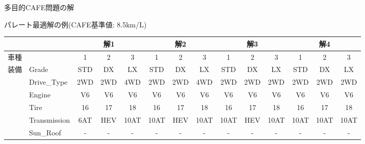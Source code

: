 \documentclass[dvipdfmx, 11pt]{beamer}
\begin{document}
\begin{frame}{多目的CAFE問題の解}\small
 \begin{exampleblock}{パレート最適解の例{\normalsize (CAFE基準値: 8.5km/L)}}
    \centering
  \tiny
  \tabcolsep=1.5mm
  \begin{tabular}{l|l|c|c|c||c|c|c||c|c|c||c|c|c}
   \multicolumn{2}{l|}{} & \multicolumn{3}{c||}{解1} & \multicolumn{3}{c||}{解2} & \multicolumn{3}{c||}{解3} & \multicolumn{3}{c}{解4}\\ \hline
   \multicolumn{2}{l|}{車種} & 1 & 2 & 3 & 1 & 2 & 3 & 1 & 2 & 3 & 1 & 2 & 3 \\ \hline
   装備 & Grade & STD & DX & LX & STD & DX & LX & STD & DX & LX & STD & DX & LX \\
       & Drive\_Type & 2WD & 2WD & \alert{4WD} & 2WD & 2WD & \alert{4WD} & 2WD & 2WD & \alert{2WD} & 2WD & 2WD & \alert{2WD}\\
       & Engine & V6 & V6 & V6 & V6 & V6 & V6 & V6 & V6 & V6 & V6 & V6 & V6 \\
       & Tire & 16 & 17 & 18 & 16 & 17 & 18 & 16 & 17 & 18 & 16 & 17 & 18 \\
       & Transmission & \alert{6AT} & \alert{HEV} & 10AT & \alert{10AT} & \alert{HEV} & 10AT & \alert{10AT} & \alert{HEV} & 10AT & \alert{10AT} & \alert{10AT} & 10AT \\
       & Sun\_Roof & - & - & - & - & - & - & - & - & - & - & - & - \\ \hline

\end{tabular}
\end{exampleblock}
\end{frame}
\end{document}
